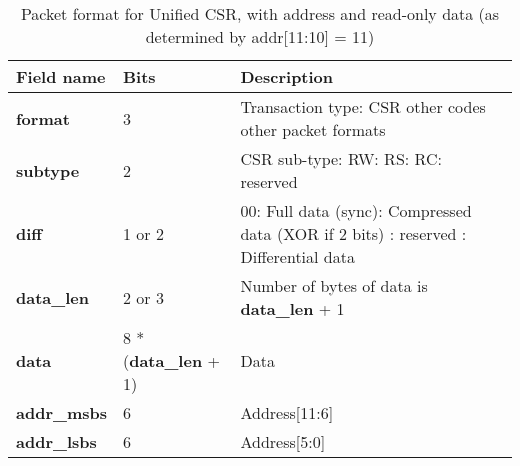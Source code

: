 \begin{table}[htp]
  \centering
  \caption{Packet format for Unified CSR, with address and read-only data (as determined by addr[11:10] = 11)}
  \label{tab:te_datadx0y11}
  \begin{tabulary}{\textwidth}{|l|p{40mm}|p{90mm}|}
    \hline
    {\bf Field name} & {\bf Bits} & {\bf Description} \\
    \hline
    \textbf{format} & 	3	& Transaction type: CSR\newline
		other codes other packet formats\\
    \hline
    \textbf{subtype} & 	2	& CSR sub-type: RW: RS: RC: reserved\\	
    \hline
    \textbf{diff} & 1 or 2 & 00: Full data (sync): Compressed data (XOR if 2 bits) : reserved : Differential data\\
    \hline
    \textbf{data\_len}	& 2 or 3 & Number of bytes of data is \textbf{data\_len} + 1\\
    \hline
    \textbf{data} & 8 * (\textbf{data\_len} + 1) & Data\\
    \hline
    \textbf{addr\_msbs} & 6  &	Address[11:6]\\
    \hline
    \textbf{addr\_lsbs} &  6 & Address[5:0] \\
    \hline
  \end{tabulary}
\end{table}

